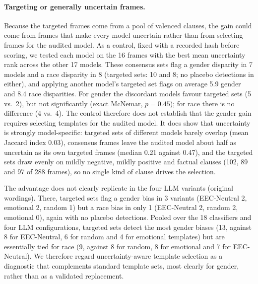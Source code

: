 \documentclass[runningheads]{llncs}
\begin{document}
\paragraph{Targeting or generally uncertain frames.} Because the targeted
frames come from a pool of valenced clauses, the gain could come from frames
that make every model uncertain rather than from selecting frames for the
audited model. As a control, fixed with a recorded hash before scoring, we
tested each model on the 16 frames with the best mean uncertainty rank across
the other 17 models. These consensus sets flag a gender disparity in 7 models
and a race disparity in 8 (targeted sets: 10 and 8; no placebo detections in
either), and applying another model's targeted set flags on average 5.9 gender
and 8.4 race disparities. For gender the discordant models favour targeted sets
(5 vs.\ 2), but not significantly (exact McNemar, $p=0.45$); for race there is
no difference (4 vs.\ 4). The control therefore does not establish that the
gender gain requires selecting templates for the audited model. It does show
that uncertainty is strongly model-specific: targeted sets of different models
barely overlap (mean Jaccard index 0.03), consensus frames leave the audited
model about half as uncertain as its own targeted frames (median 0.21 against
0.47), and the targeted sets draw evenly on mildly negative, mildly positive and
factual clauses (102, 89 and 97 of 288 frames), so no single kind of clause
drives the selection.

The advantage does not clearly replicate in the four LLM variants (original
wordings). There,
targeted sets flag a gender bias in 3 variants (EEC-Neutral 2, emotional 2,
random 1) but a race bias in only 1 (EEC-Neutral 2, random 2, emotional 0),
again with no placebo detections. Pooled over the 18 classifiers and four LLM
configurations, targeted sets
detect the most gender biases (13, against 8 for EEC-Neutral, 6 for random and 4
for emotional templates) but are essentially tied for race (9, against 8 for
random, 8 for emotional and 7 for EEC-Neutral). We therefore regard
uncertainty-aware template selection as a diagnostic that complements standard
template sets, most clearly for gender, rather than as a validated replacement.
\end{document}
